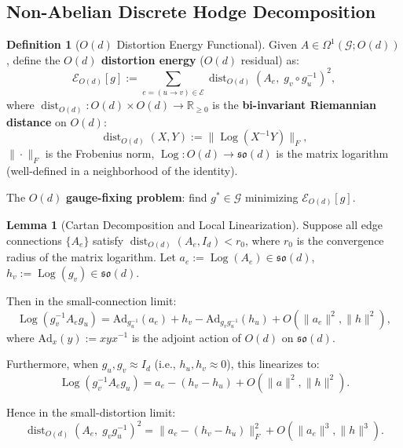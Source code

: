 \documentclass[12pt,a4paper]{article}
\theoremstyle{definition}
\newtheorem{definition}{Definition}[section]
\newtheorem{lemma}{Lemma}[section]
\theoremstyle{remark}
\theoremstyle{definition}
\newcommand{\R}{\mathbb{R}}
\newcommand{\Od}{O(d)}
\newcommand{\grph}{\mathcal{G}}
\newcommand{\edgs}{\mathcal{E}}
\newcommand{\Ad}{\mathrm{Ad}}
\DeclareMathOperator{\dist}{dist}
\DeclareMathOperator{\Log}{Log}
\begin{document}
\subsection{Non-Abelian Discrete Hodge Decomposition}

\begin{definition}[$O(d)$ Distortion Energy Functional]\label{def:od_energy}
Given $A \in \Omega^1(\grph; \Od)$, define the \textbf{$O(d)$ distortion energy} ($O(d)$ residual) as:
\[
    \mathcal{E}_{\Od}[g] := \sum_{e = (u \to v) \in \edgs} \dist_{\Od}(A_e,\; g_v \circ g_u^{-1})^2,
\]
where $\dist_{\Od}: \Od \times \Od \to \R_{\geq 0}$ is the \textbf{bi-invariant Riemannian distance} on $\Od$:
\[
    \dist_{\Od}(X, Y) := \|\Log(X^{-1} Y)\|_F,
\]
$\|\cdot\|_F$ is the Frobenius norm, $\Log: \Od \to \mathfrak{so}(d)$ is the matrix logarithm (well-defined in a neighborhood of the identity).

The $O(d)$ \textbf{gauge-fixing problem}: find $g^* \in \mathcal{G}$ minimizing $\mathcal{E}_{\Od}[g]$.
\end{definition}

\begin{lemma}[Cartan Decomposition and Local Linearization]\label{lem:cartan}
Suppose all edge connections $\{A_e\}$ satisfy $\dist_{\Od}(A_e, I_d) < r_0$, where $r_0$ is the convergence radius of the matrix logarithm.
Let $a_e := \Log(A_e) \in \mathfrak{so}(d)$, $h_v := \Log(g_v) \in \mathfrak{so}(d)$.

Then in the small-connection limit:
\[
    \Log(g_v^{-1} A_e g_u) = \Ad_{g_u^{-1}}(a_e) + h_v - \Ad_{g_v g_u^{-1}}(h_u) + O(\|a_e\|^2, \|h\|^2),
\]
where $\Ad_x(y) := x y x^{-1}$ is the adjoint action of $\Od$ on $\mathfrak{so}(d)$.

Furthermore, when $g_u, g_v \approx I_d$ (i.e., $h_u, h_v \approx 0$), this linearizes to:
\[
    \Log(g_v^{-1} A_e g_u) = a_e - (h_v - h_u) + O(\|a\|^2, \|h\|^2).
\]

Hence in the small-distortion limit:
\[
    \dist_{\Od}(A_e,\; g_v g_u^{-1})^2 = \|a_e - (h_v - h_u)\|_F^2 + O(\|a_e\|^3, \|h\|^3).
\]
\end{lemma}
\end{document}
